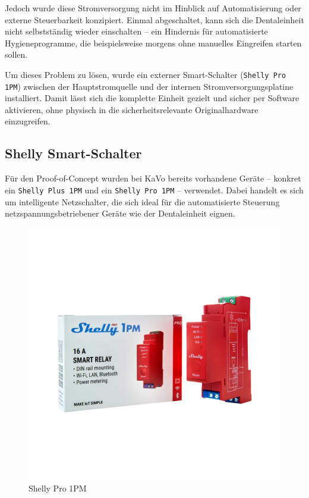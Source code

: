 Jedoch wurde diese Stromversorgung nicht im Hinblick auf Automatisierung oder externe Steuerbarkeit konzipiert. Einmal abgeschaltet, kann sich die Dentaleinheit nicht selbstständig wieder einschalten – ein Hindernis für automatisierte Hygieneprogramme, die beispielsweise morgens ohne manuelles Eingreifen starten sollen.

Um dieses Problem zu lösen, wurde ein externer Smart-Schalter (\texttt{Shelly Pro 1PM}) zwischen der Hauptstromquelle und der internen Stromversorgungsplatine installiert. Damit lässt sich die komplette Einheit gezielt und sicher per Software aktivieren, ohne physisch in die sicherheitsrelevante Originalhardware einzugreifen.


\subsection{Shelly Smart-Schalter}

Für den Proof-of-Concept wurden bei KaVo bereits vorhandene Geräte – konkret ein \texttt{Shelly Plus 1PM} und ein \texttt{Shelly Pro 1PM} – verwendet. Dabei handelt es sich um intelligente Netzschalter, die sich ideal für die automatisierte Steuerung netzspannungsbetriebener Geräte wie der Dentaleinheit eignen.

\begin{figure}[H]
  \centering
  \includegraphics[width=1\textwidth]{images/Shelly-Pro-1PM-3.jpg}
  \caption{Shelly Pro 1PM}
  \label{fig:Shelly Pro 1PM}
\end{figure}

